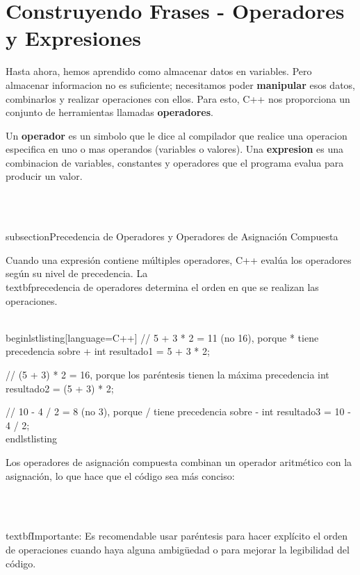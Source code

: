 \section{Construyendo Frases - Operadores y Expresiones}
\label{sec:operadores_expresiones}

Hasta ahora, hemos aprendido como almacenar datos en variables. Pero almacenar informacion no es suficiente; necesitamos poder \textbf{manipular} esos datos, combinarlos y realizar operaciones con ellos. Para esto, C++ nos proporciona un conjunto de herramientas llamadas \textbf{operadores}.

Un \textbf{operador} es un simbolo que le dice al compilador que realice una operacion especifica en uno o mas operandos (variables o valores). Una \textbf{expresion} es una combinacion de variables, constantes y operadores que el programa evalua para producir un valor.

\

\\subsection{Precedencia de Operadores y Operadores de Asignación Compuesta}

Cuando una expresión contiene múltiples operadores, C++ evalúa los operadores según su nivel de precedencia. La \\textbf{precedencia de operadores} determina el orden en que se realizan las operaciones.

\\begin{lstlisting}[language=C++]
// 5 + 3 * 2 = 11 (no 16), porque * tiene precedencia sobre +
int resultado1 = 5 + 3 * 2;

// (5 + 3) * 2 = 16, porque los paréntesis tienen la máxima precedencia
int resultado2 = (5 + 3) * 2;

// 10 - 4 / 2 = 8 (no 3), porque / tiene precedencia sobre -
int resultado3 = 10 - 4 / 2;
\\end{lstlisting}

Los operadores de asignación compuesta combinan un operador aritmético con la asignación, lo que hace que el código sea más conciso:

\

\\textbf{Importante:} Es recomendable usar paréntesis para hacer explícito el orden de operaciones cuando haya alguna ambigüedad o para mejorar la legibilidad del código.
